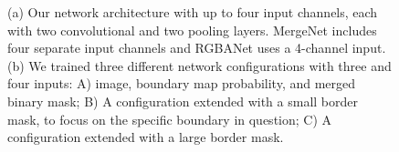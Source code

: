 \begin{figure}[t]
 \centering

	\caption{(a) Our network architecture with up to four input channels, each with two convolutional and two pooling layers. MergeNet includes four separate input channels and RGBANet uses a 4-channel input. (b) We trained three different network configurations with three and four inputs: A) image, boundary map probability, and merged binary mask; B) A configuration extended with a small border mask, to focus on the specific boundary in question; C) A configuration extended with a large border mask.}

\end{figure}


